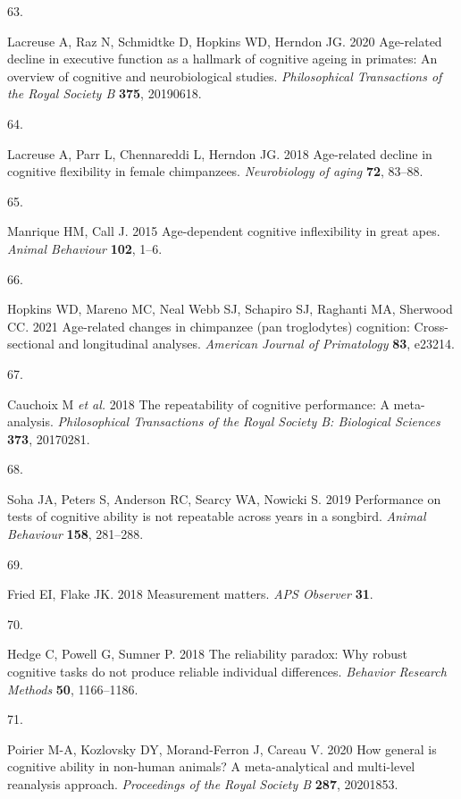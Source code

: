 \documentclass[
  man,floatsintext]{apa6}
\newlength{\cslhangindent}
\newlength{\csllabelwidth}
\newenvironment{CSLReferences}[2] %
 {\begin{list}{}{%
  \setlength{\itemindent}{0pt}
  \setlength{\leftmargin}{0pt}
  \setlength{\parsep}{0pt}
  \ifodd #1
   \setlength{\leftmargin}{\cslhangindent}
   \setlength{\itemindent}{-1\cslhangindent}
  \fi
  \setlength{\itemsep}{#2\baselineskip}}}
 {\end{list}}
\newcommand{\CSLLeftMargin}[1]{\parbox[t]{\csllabelwidth}{\strut#1\strut}}
\newcommand{\CSLRightInline}[1]{\parbox[t]{\linewidth - \csllabelwidth}{\strut#1\strut}}
\begin{document}
\begin{CSLReferences}{0}{1}
\CSLLeftMargin{63. }%
\CSLRightInline{Lacreuse A, Raz N, Schmidtke D, Hopkins WD, Herndon JG. 2020 Age-related decline in executive function as a hallmark of cognitive ageing in primates: An overview of cognitive and neurobiological studies. \emph{Philosophical Transactions of the Royal Society B} \textbf{375}, 20190618.}

\CSLLeftMargin{64. }%
\CSLRightInline{Lacreuse A, Parr L, Chennareddi L, Herndon JG. 2018 Age-related decline in cognitive flexibility in female chimpanzees. \emph{Neurobiology of aging} \textbf{72}, 83--88.}

\CSLLeftMargin{65. }%
\CSLRightInline{Manrique HM, Call J. 2015 Age-dependent cognitive inflexibility in great apes. \emph{Animal Behaviour} \textbf{102}, 1--6.}

\CSLLeftMargin{66. }%
\CSLRightInline{Hopkins WD, Mareno MC, Neal Webb SJ, Schapiro SJ, Raghanti MA, Sherwood CC. 2021 Age-related changes in chimpanzee (pan troglodytes) cognition: Cross-sectional and longitudinal analyses. \emph{American Journal of Primatology} \textbf{83}, e23214.}

\CSLLeftMargin{67. }%
\CSLRightInline{Cauchoix M \emph{et al.} 2018 The repeatability of cognitive performance: A meta-analysis. \emph{Philosophical Transactions of the Royal Society B: Biological Sciences} \textbf{373}, 20170281.}

\CSLLeftMargin{68. }%
\CSLRightInline{Soha JA, Peters S, Anderson RC, Searcy WA, Nowicki S. 2019 Performance on tests of cognitive ability is not repeatable across years in a songbird. \emph{Animal Behaviour} \textbf{158}, 281--288.}

\CSLLeftMargin{69. }%
\CSLRightInline{Fried EI, Flake JK. 2018 Measurement matters. \emph{APS Observer} \textbf{31}.}

\CSLLeftMargin{70. }%
\CSLRightInline{Hedge C, Powell G, Sumner P. 2018 The reliability paradox: Why robust cognitive tasks do not produce reliable individual differences. \emph{Behavior Research Methods} \textbf{50}, 1166--1186.}

\CSLLeftMargin{71. }%
\CSLRightInline{Poirier M-A, Kozlovsky DY, Morand-Ferron J, Careau V. 2020 How general is cognitive ability in non-human animals? A meta-analytical and multi-level reanalysis approach. \emph{Proceedings of the Royal Society B} \textbf{287}, 20201853.}

\end{CSLReferences}
\end{document}
